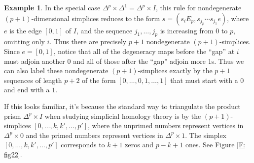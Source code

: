 \documentclass[12pt]{article}
\theoremstyle{plain}
\theoremstyle{definition}
\newtheorem{example}[theorem]{Example}
\begin{document}
\begin{example}
In the special case $\Delta^p\times \Delta^1=\Delta^p\times I$, this rule for nondegenerate $(p+1)$-dimensional simplices reduces to the form $s=(s_i E_p, s_{j_p}\cdots s_{j_1} e)$, where $e$ is the edge $[0,1]$ of $I$, and the sequence $j_1,\ldots, j_p$ is increasing from $0$ to $p$, omitting only $i$. Thus there are precisely $p+1$ nondegenerate $(p+1)$-simplices. Since $e=[0,1]$, notice that all of the degeneracy maps before the ``gap'' at $i$ must adjoin another $0$ and all of those after the ``gap'' adjoin more $1$s. Thus we can also label these nondegenerate $(p+1)$-simplices exactly by the $p+1$ sequences of length $p+2$ of the form $[0,\ldots, 0,1,\ldots,1]$ that must start with a $0$ and end with a $1$.

If this looks familiar, it's because the standard way to triangulate the product prism $\Delta^p\times I$ when studying simplicial homology theory is by the $(p+1)$-simplices $[0,\ldots, k,k',\ldots, p']$, where  the unprimed numbers represent vertices in $\Delta^p\times 0$ and the primed numbers represent vertices in $\Delta^p\times 1$. The simplex $[0,\ldots,k,k',\ldots, p']$ corresponds to $k+1$ zeros and $p-k+1$ ones. See Figure \ref{F: fig22}.



\end{example}
\end{document}
